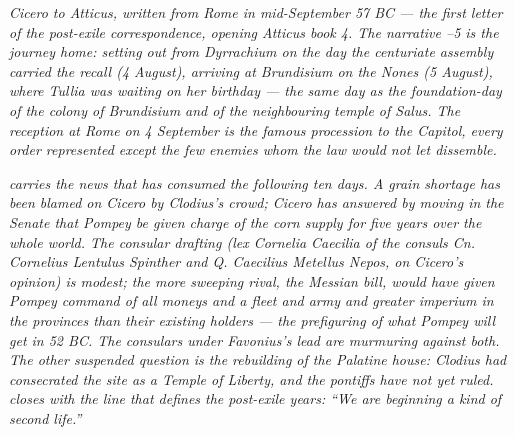 
\textit{Cicero to Atticus, written from Rome in mid-September
57 BC --- the first letter of the post-exile correspondence,
opening Atticus book 4. The narrative --5 is
the journey home: setting out from Dyrrachium on the day
the centuriate assembly carried the recall (4 August),
arriving at Brundisium on the Nones (5 August), where Tullia
was waiting on her birthday --- the same day as the
foundation-day of the colony of Brundisium and of the
neighbouring temple of Salus. The reception at Rome on
4 September is the famous procession to the Capitol, every
order represented except the few enemies whom the law would
not let dissemble.}

\textit{ carries the news that has consumed the
following ten days. A grain shortage has been blamed on
Cicero by Clodius's crowd; Cicero has answered by moving in
the Senate that Pompey be given charge of the corn supply for
five years over the whole world. The consular drafting
(\textit{lex Cornelia Caecilia} of the consuls Cn. Cornelius
Lentulus Spinther and Q. Caecilius Metellus Nepos, on Cicero's
opinion) is modest; the more sweeping rival, the Messian
bill, would have given Pompey command of all moneys and a
fleet and army and greater \textit{imperium} in the provinces
than their existing holders --- the prefiguring of what
Pompey will get in 52 BC. The consulars under Favonius's lead
are murmuring against both. The other suspended question is
the rebuilding of the Palatine house: Clodius had consecrated
the site as a Temple of Liberty, and the pontiffs have not
yet ruled.  closes with the line that defines
the post-exile years: ``We are beginning a kind of second
life.''}
